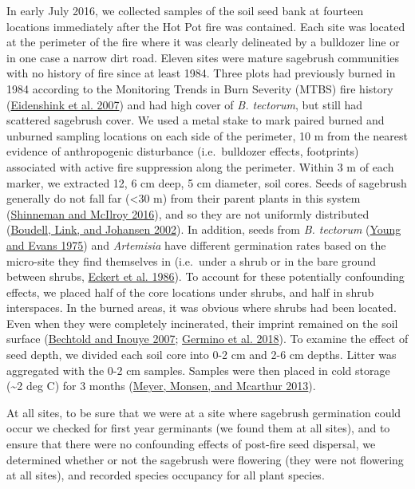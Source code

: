 \documentclass[
  12pt,
]{article}
\begin{document}
In early July 2016, we collected samples of the soil seed bank at
fourteen locations immediately after the Hot Pot fire was contained.
Each site was located at the perimeter of the fire where it was clearly
delineated by a bulldozer line or in one case a narrow dirt road. Eleven
sites were mature sagebrush communities with no history of fire since at
least 1984. Three plots had previously burned in 1984 according to the
Monitoring Trends in Burn Severity (MTBS) fire history
(\protect\hyperlink{ref-Eidenshink2007}{Eidenshink et al. 2007}) and had
high cover of \emph{B. tectorum}, but still had scattered sagebrush
cover. We used a metal stake to mark paired burned and unburned sampling
locations on each side of the perimeter, 10 m from the nearest evidence
of anthropogenic disturbance (i.e.~bulldozer effects, footprints)
associated with active fire suppression along the perimeter. Within 3 m
of each marker, we extracted 12, 6 cm deep, 5 cm diameter, soil cores.
Seeds of sagebrush generally do not fall far (\textless30 m) from their
parent plants in this system
(\protect\hyperlink{ref-Shinneman2016}{Shinneman and McIlroy 2016}), and
so they are not uniformly distributed
(\protect\hyperlink{ref-Boudell2002}{Boudell, Link, and Johansen 2002}).
In addition, seeds from \emph{B. tectorum}
(\protect\hyperlink{ref-Young1975}{Young and Evans 1975}) and
\emph{Artemisia} have different germination rates based on the
micro-site they find themselves in (i.e.~under a shrub or in the bare
ground between shrubs, \protect\hyperlink{ref-Eckert1986}{Eckert et al.
1986}). To account for these potentially confounding effects, we placed
half of the core locations under shrubs, and half in shrub interspaces.
In the burned areas, it was obvious where shrubs had been located. Even
when they were completely incinerated, their imprint remained on the
soil surface (\protect\hyperlink{ref-Bechtold2007}{Bechtold and Inouye
2007}; \protect\hyperlink{ref-Germino2018}{Germino et al. 2018}). To
examine the effect of seed depth, we divided each soil core into 0-2 cm
and 2-6 cm depths. Litter was aggregated with the 0-2 cm samples.
Samples were then placed in cold storage (\textasciitilde2 deg C) for 3
months (\protect\hyperlink{ref-Meyer2013}{Meyer, Monsen, and Mcarthur
2013}).

At all sites, to be sure that we were at a site where sagebrush
germination could occur we checked for first year germinants (we found
them at all sites), and to ensure that there were no confounding effects
of post-fire seed dispersal, we determined whether or not the sagebrush
were flowering (they were not flowering at all sites), and recorded
species occupancy for all plant species.
\end{document}
